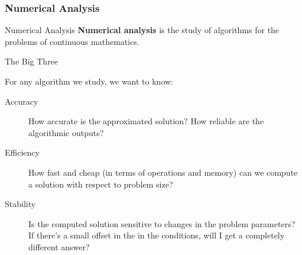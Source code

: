 \documentclass[10pt]{beamer}
\begin{document}
\begin{frame}
\frametitle{Numerical Analysis}
\begin{block}{Numerical Analysis}    
\textbf{Numerical analysis} is the study of algorithms for the problems of continuous mathematics. 
\end{block}

\bigskip
{}

\end{frame}


\begin{frame}{The Big Three}

For any algorithm we study, we want to know: \bigskip

\begin{description}
\item[Accuracy] How accurate is the approximated solution? How reliable are the algorithmic outputs?\\  \bigskip

\item[Efficiency] How fast and cheap (in terms of operations and memory) can we compute a solution with respect to problem size?\\ \bigskip

\item[Stability] Is the computed solution sensitive to changes in the problem parameters? If there's a small offset in the in the conditions, will I get a completely different answer? 
\end{description}
\end{frame}
\end{document}
